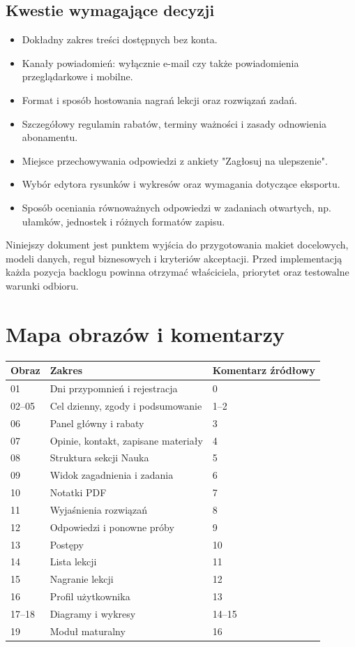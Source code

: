 \documentclass[12pt,a4paper]{report}
\begin{document}
\section{Kwestie wymagające decyzji}
\begin{itemize}
  \item Dokładny zakres treści dostępnych bez konta.
  \item Kanały powiadomień: wyłącznie e-mail czy także powiadomienia przeglądarkowe i mobilne.
  \item Format i sposób hostowania nagrań lekcji oraz rozwiązań zadań.
  \item Szczegółowy regulamin rabatów, terminy ważności i zasady odnowienia abonamentu.
  \item Miejsce przechowywania odpowiedzi z ankiety "Zagłosuj na ulepszenie".
  \item Wybór edytora rysunków i wykresów oraz wymagania dotyczące eksportu.
  \item Sposób oceniania równoważnych odpowiedzi w zadaniach otwartych, np. ułamków, jednostek i różnych formatów zapisu.
\end{itemize}
\begin{ElearnImportant}
Niniejszy dokument jest punktem wyjścia do przygotowania makiet docelowych, modeli danych, reguł biznesowych i kryteriów akceptacji. Przed implementacją każda pozycja backlogu powinna otrzymać właściciela, priorytet oraz testowalne warunki odbioru.
\end{ElearnImportant}

\appendix
\chapter{Mapa obrazów i komentarzy}
\begin{longtable}{@{}p{}p{}p{}@{}}
\toprule
\textbf{Obraz} & \textbf{Zakres} & \textbf{Komentarz źródłowy}\\
\midrule
\endhead
01 & Dni przypomnień i rejestracja & 0\\
02--05 & Cel dzienny, zgody i podsumowanie & 1--2\\
06 & Panel główny i rabaty & 3\\
07 & Opinie, kontakt, zapisane materiały & 4\\
08 & Struktura sekcji Nauka & 5\\
09 & Widok zagadnienia i zadania & 6\\
10 & Notatki PDF & 7\\
11 & Wyjaśnienia rozwiązań & 8\\
12 & Odpowiedzi i ponowne próby & 9\\
13 & Postępy & 10\\
14 & Lista lekcji & 11\\
15 & Nagranie lekcji & 12\\
16 & Profil użytkownika & 13\\
17--18 & Diagramy i wykresy & 14--15\\
19 & Moduł maturalny & 16\\
\bottomrule
\end{longtable}
\end{document}
